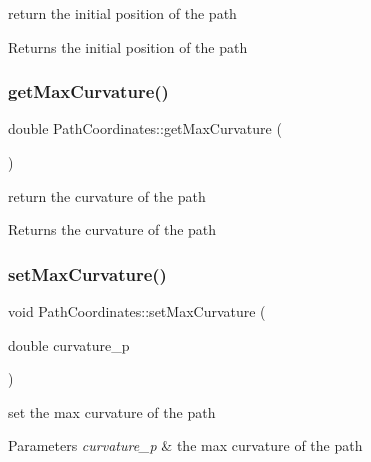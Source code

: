 return the initial position of the path 

\begin{DoxyReturn}{Returns}
the initial position of the path 
\end{DoxyReturn}
\mbox{\label{class_path_coordinates_a6b0315b737b35af2e198a7094828741e}} 
\subsubsection{\texorpdfstring{get\+Max\+Curvature()}{getMaxCurvature()}}
{\footnotesize\ttfamily double Path\+Coordinates\+::get\+Max\+Curvature (\begin{DoxyParamCaption}{ }\end{DoxyParamCaption})}



return the curvature of the path 

\begin{DoxyReturn}{Returns}
the curvature of the path 
\end{DoxyReturn}
\mbox{\label{class_path_coordinates_abd7e9a8143e368f9290b962f595ae0a8}} 
\subsubsection{\texorpdfstring{set\+Max\+Curvature()}{setMaxCurvature()}}
{\footnotesize\ttfamily void Path\+Coordinates\+::set\+Max\+Curvature (\begin{DoxyParamCaption}\item[{double}]{curvature\+\_\+p }\end{DoxyParamCaption})}



set the max curvature of the path 


\begin{DoxyParams}{Parameters}
{\em curvature\+\_\+p} & the max curvature of the path \\
\hline
\end{DoxyParams}
\mbox{\label{class_path_coordinates_a730ba85010cbd33da4e76fe0f05fb2b0}} 
